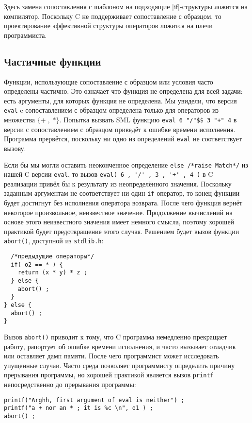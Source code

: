 Здесь замена сопоставления с шаблоном на подходящие \inline|if|-структуры ложится на компилятор. Поскольку C не поддерживает сопоставление с образцом, то проектирование эффективной структуры операторов ложится на плечи программиста.

\subsection{Частичные функции}\label{PartialFunctions}

Функции, использующие сопоставление с образцом или условия часто определены частично. Это означает что функция не определена для всей задачи: есть аргументы, для которых функция не определена. Мы увидели, что версия \lstinline|eval| c сопоставлением с образцом определена только для операторов из множества $\{+ \; , \; *\}$. Попытка вызвать SML функцию \lstinline|eval 6 "/"$$ 3 "+" 4| в версии с сопоставлением с образцом приведёт к ошибке времени исполнения. Программа прервётся, поскольку ни одно из определений \lstinline|eval| не соответствует вызову.

Если бы мы могли оставить неоконченное определение \lstinline|else /*raise Match*/| из нашей C версии \lstinline|eval|, то вызов \lstinline|eval( 6 , '/' , 3 , '+' , 4 )| в C реализации привёл бы к результату из неопределённого значения. Поскольку заданным аргументам не соответствует ни один \lstinline|if| оператор, то конец функции будет достигнут без исполнения оператора возврата. После чего функция вернёт некоторое произвольное, неизвестное значение. Продолжение вычислений на основе этого неизвестного значения имеет немного смысла, поэтому хорошей практикой будет предотвращение этого случая. Решением будет вызов функции \lstinline|abort()|, доступной из \lstinline|stdlib.h|:

\begin{lstlisting}
  /*предыдущие операторы*/
  if( o2 == * ) {
    return (x * y) * z ;
  } else {
    abort() ;
  }
} else {
  abort() ;
}
\end{lstlisting}

Вызов \lstinline|abort()| приводит к тому, что C программа немедленно прекращает работу, рапортует об ошибке времени исполнения, и часто вызывает отладчик или оставляет дамп памяти. После чего программист может исследовать упущенные случаи. Часто среда позволяет программисту определить причину прерывания программы, но хорошей практикой является вызов \lstinline|printf| непосредственно до прерывания программы:

\begin{lstlisting}
printf("Arghh, first argument of eval is neither") ;
printf("a + nor an * ; it is %c \n", o1 ) ;
abort() ;
\end{lstlisting}

